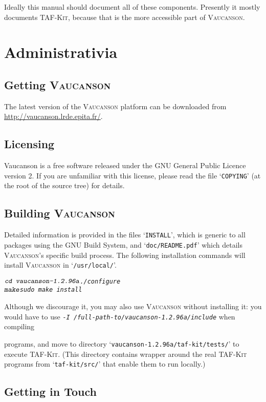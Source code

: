 \documentclass[a4paper]{report}
\makeatletter
\newcommand{\Cxx}{%
  \valign{\vfil\hbox{##}\vfil\cr
    {C\kern-.1em}\cr
    $\hbox{\fontsize\sf@size\z@\textbf{+\kern-0.05em+}}$\cr}%
    \xspace
}
\newenvironment{shell}
{\begin{alltt}}
{\end{alltt}}
\def\VcsnVersion{1.2.96a}
\newcommand\kbd[1]{\textsl{\texttt{#1}}}
\newcommand\file[1]{`\texttt{#1}'}
\newcommand{\tafkit}{\textsc{TAF-Kit}\xspace}
\newcommand{\Vauc}{\textsc{Vaucanson}\xspace}
\makeatother
\begin{document}
Ideally this manual should document all of these components.
Presently it mostly documents \tafkit, because that is the more
accessible part of \Vauc.


\chapter{Administrativia}

\section{Getting \Vauc}

The latest version of the \Vauc platform can be downloaded from
\url{http://vaucanson.lrde.epita.fr/}.

\section{Licensing}

Vaucanson is a free software released under the GNU General Public
Licence version 2. If you are unfamiliar with this license, please
read the file \file{COPYING} (at the root of the source tree) for
details.

\section{Building \Vauc}\label{sec:building}

Detailed information is provided in the files \file{INSTALL}, which is
generic to all packages using the GNU Build System, and
\file{doc/README.pdf} which details \Vauc's specific build process.
The following installation commands will install \Vauc in
\file{/usr/local/}.

\begin{shell}
$ \kbd{cd vaucanson-\VcsnVersion}
$ \kbd{./configure}
$ \kbd{make}
$ \kbd{sudo make install}
\end{shell}

Although we discourage it, you may also use \Vauc without installing
it: you would have to use \kbd{-I
  /full-path-to/vaucanson-\VcsnVersion/include} when compiling \Cxx
programs, and move to directory
\file{vaucanson-\VcsnVersion/taf-kit/tests/} to execute \tafkit.
(This directory contains wrapper around the real \tafkit programs from
\file{taf-kit/src/} that enable them to run locally.)

\section{Getting in Touch}
\end{document}
